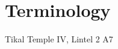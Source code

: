 \documentclass[../main.tex]{subfiles}
\begin{document}
\chapter{Terminology}

Tikal Temple IV, Lintel 2 A7
\end{document}
